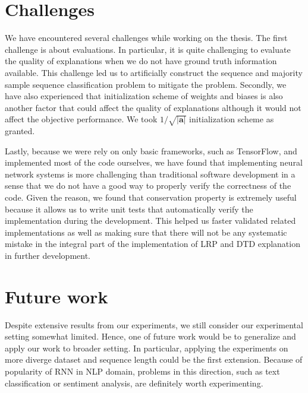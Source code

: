 %




\section{Challenges}
We have encountered several challenges while working on the thesis. The first challenge is about evaluations. In particular, it is quite challenging to evaluate the quality of explanations when we do not have ground truth information available. This challenge led us to artificially construct the sequence and majority sample sequence classification problem to mitigate the problem.  Secondly, we have also experienced that initialization scheme of weights and biases is also another factor that could affect the quality of explanations although it would not affect the objective performance. We took $1/\sqrt{|\boldsymbol{a}|}$ initialization scheme as granted.


Lastly, because we were rely on only basic frameworks, such as TensorFlow, and implemented most of the code ourselves, we have found that implementing neural network systems is more challenging than traditional software development in a sense that we do not have a good way to properly verify the correctness of the code. Given the reason, we found that conservation property is extremely useful because it allows us to write unit tests that automatically verify the implementation during the development. This helped us faster validated related implementations as well as making sure that there will not be any systematic mistake in the integral part of the implementation of LRP and DTD explanation in further development.


\section{Future work}
Despite extensive results from our experiments, we still consider our experimental setting somewhat limited. Hence, one of future work would be to generalize and apply our work to broader setting. In particular,  applying the experiments on more diverge dataset and sequence length could be the first extension. Because of popularity of RNN in NLP domain, problems in this direction, such as text classification or sentiment analysis, are definitely worth experimenting. 

